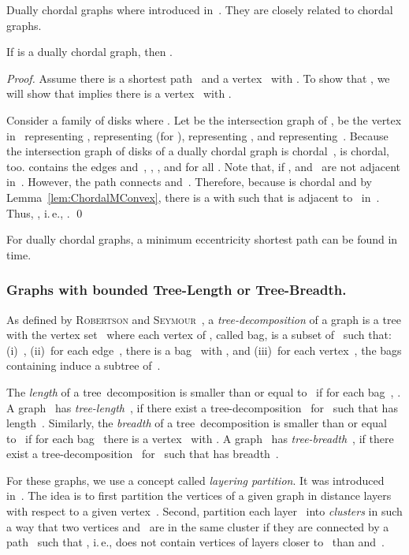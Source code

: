 \documentclass[10pt]{llncs}
\makeatletter
\newcommand{\ie}{i.\,e.\@ifnextchar{,}{}{~}}
\makeatother
\begin{document}
Dually chordal graphs where introduced in~\cite{BraDraCheVol1998}.
They are closely related to chordal graphs.

\begin{lemma}
If  is a dually chordal graph, then .
\end{lemma}

\begin{proof}
Assume there is a shortest path~ and a vertex~ with .
To show that , we will show that  implies there is a vertex~ with .

Consider a family of disks  where .
Let  be the intersection graph of ,  be the vertex in~ representing ,  representing  (for ),  representing , and  representing~.
Because the intersection graph of disks of a dually chordal graph is chordal~\cite{BraDraCheVol1998},  is chordal, too.
 contains the edges  and~, , , and  for all .
Note that, if ,  and~ are not adjacent in~.
However, the path  connects  and~.
Therefore, because  is chordal and by Lemma~\ref{lem:ChordalMConvex}, there is a  with  such that  is adjacent to~ in~.
Thus, , \ie, .
\qed
\end{proof}

\begin{corollary}
For dually chordal graphs, a minimum eccentricity shortest path can be found in  time.
\end{corollary}

\subsubsection{Graphs with bounded Tree-Length or Tree-Breadth.}

As defined by \textsc{Robertson} and \textsc{Seymour}~\cite{RobertSeymou1986}, a \emph{tree-decomposition} of a graph  is a tree  with the vertex set~ where each vertex of , called bag, is a subset of~ such that:
(i)~, (ii)~for each edge~, there is a bag~ with , and (iii)~for each vertex~, the bags containing  induce a subtree of~.

The \emph{length} of a tree~decomposition is smaller than or equal to~ if for each bag~, .
A graph~ has \emph{tree-length}~, if there exist a tree-decomposition~ for~ such that  has length~.
Similarly, the \emph{breadth} of a tree~decomposition is smaller than or equal to~ if for each bag~ there is a vertex~ with .
A graph~ has \emph{tree-breadth}~, if there exist a tree-decomposition~ for~ such that  has breadth~.

For these graphs, we use a concept called \emph{layering partition}.
It was introduced in~\cite{BranChepDrag1999,ChepoiDragan2000}.
The idea is to first partition the vertices of a given graph in distance layers~ with respect to a given vertex~.
Second, partition each layer~ into \emph{clusters} in such a way that two vertices  and~ are in the same cluster if they are connected by a path~ such that , \ie,  does not contain vertices of layers closer to~ than  and~.
\end{document}
